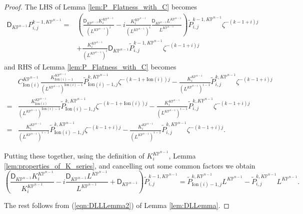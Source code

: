 \documentclass[12pt]{amsart}
\numberwithin{equation}{section}
\newcommand{\KP}{K\mathbb{P}}
\begin{document}
\begin{proof}
The LHS of Lemma \ref{lem:P_Flatness_with_C} becomes
\begin{equation*}
\begin{aligned}
\mathsf{D}_{\KP^{n-1}}P_{i,j}^{k-1,\KP^{n-1}}
=&\left(\frac{\mathsf{D}_{\KP^{n-1}}K^{\KP^{n-1}}_i}{(L^{\KP^{n-1}})^i}-i\frac{K^{\KP^{n-1}}_i}{(L^{\KP^{n-1}})^i}\frac{\mathsf{D}_{\KP^{n-1}}L^{\KP^{n-1}}}{L^{\KP^{n-1}}}\right)\widetilde{P}_{i,j}^{k-1,\KP^{n-1}}\zeta^{-(k-1+i)j}\\
&+\frac{K^{\KP^{n-1}}_i}{(L^{\KP^{n-1}})^i}\mathsf{D}_{\KP^{n-1}}\widetilde{P}_{i,j}^{k-1,\KP^{n-1}}\zeta^{-(k-1+i)j}
\end{aligned}
\end{equation*}
and RHS of Lemma \ref{lem:P_Flatness_with_C} becomes
\begin{align*}
&C^{\KP^{n-1}}_{\mathrm{Ion}(i)}\frac{K^{\KP^{n-1}}_{{\mathrm{Ion}(i)}-1}}{(L^{\KP^{n-1}})^{{\mathrm{Ion}(i)}-1}}\widetilde{P}_{{\mathrm{Ion}(i)}-1,j}^{k,\KP^{n-1}}\zeta^{-(k-1+{\mathrm{Ion}(i)})j}-\frac{K^{\KP^{n-1}}_i}{(L^{\KP^{n-1}})^{i-1}}\widetilde{P}_{i,j}^{k,\KP^{n-1}}\zeta^{-(k-1+i)j}\\
=&\frac{K^{\KP^{n-1}}_{{\mathrm{Ion}(i)}}}{(L^{\KP^{n-1}})^{{\mathrm{Ion}(i)}-1}}\widetilde{P}_{{\mathrm{Ion}(i)}-1,j}^{k,\KP^{n-1}}\zeta^{-(k-1+{\mathrm{Ion}(i)})j}-\frac{K^{\KP^{n-1}}_i}{(L^{\KP^{n-1}})^{i-1}}\widetilde{P}_{i,j}^{k,\KP^{n-1}}\zeta^{-(k-1+i)j}\\
=&\frac{K^{\KP^{n-1}}_i}{(L^{\KP^{n-1}})^{i-1}}\widetilde{P}_{{\mathrm{Ion}(i)}-1,j}^{k,\KP^{n-1}}\zeta^{-(k-1+i)j}-\frac{K^{\KP^{n-1}}_i}{(L^{\KP^{n-1}})^{i-1}}\widetilde{P}_{i,j}^{k,\KP^{n-1}}\zeta^{-(k-1+i)j}.
\end{align*}

Putting these together, using the definition of $K^{\KP^{n-1}}_i$, Lemma \ref{lem:properties_of_K_series}, and cancelling out some common factors we obtain
\begin{equation*}
\left(\frac{\mathsf{D}_{\KP^{n-1}}K^{\KP^{n-1}}_i}{K^{\KP^{n-1}}_i}-i\frac{\mathsf{D}_{\KP^{n-1}}L^{\KP^{n-1}}}{L^{\KP^{n-1}}}+\mathsf{D}_{\KP^{n-1}}\right)\widetilde{P}_{i,j}^{k-1,\KP^{n-1}}=
\widetilde{P}_{{\mathrm{Ion}(i)}-1,j}^{k,\KP^{n-1}}L^{\KP^{n-1}}-\widetilde{P}_{i,j}^{k,\KP^{n-1}}L^{\KP^{n-1}}.
\end{equation*}

The rest follows from (\ref{eqn:DLLLemma2}) of Lemma \ref{lem:DLLemma}.
\end{proof}
\end{document}

